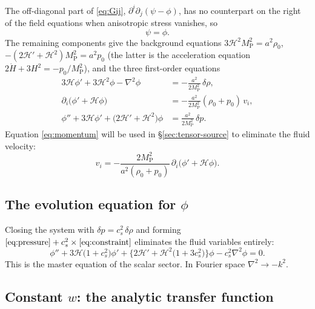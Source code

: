 \documentclass[11pt,a4paper]{article}
\newcommand{\cH}{\mathcal{H}}
\newcommand{\MP}{M_{\mathrm{P}}}
\theoremstyle{remark}
\begin{document}
The off-diagonal part of \eqref{eq:Gij}, $\partial^i\partial_j(\psi-\phi)$, has no counterpart on the right of the field equations when anisotropic stress vanishes, so
\begin{equation}
\psi = \phi .
\label{eq:psi-eq-phi}
\end{equation}
The remaining components give the background equations $3\cH^2\MP^2 = a^2\rho_0$, $-(2\cH'+\cH^2)\MP^2 = a^2p_0$ (the latter is the acceleration equation $2\dot H + 3H^2 = -p_0/\MP^2$), and the three first-order equations
\begin{align}
3\cH\phi' + 3\cH^2\phi - \nabla^2\phi &= -\frac{a^2}{2\MP^2}\,\delta\rho,
\label{eq:constraint}\\
\partial_i\big(\phi'+\cH\phi\big) &= -\frac{a^2}{2\MP^2}(\rho_0+p_0)\,v_i,
\label{eq:momentum}\\
\phi'' + 3\cH\phi' + \big(2\cH'+\cH^2\big)\phi &= \frac{a^2}{2\MP^2}\,\delta p .
\label{eq:pressure}
\end{align}
Equation \eqref{eq:momentum} will be used in \S\ref{sec:tensor-source} to eliminate the fluid velocity:
\begin{equation}
v_i = -\frac{2\MP^2}{a^2(\rho_0+p_0)}\,\partial_i\big(\phi'+\cH\phi\big).
\label{eq:velocity}
\end{equation}

\subsection{The evolution equation for \texorpdfstring{$\phi$}{phi}}

Closing the system with $\delta p = c_s^2\,\delta\rho$ and forming $\eqref{eq:pressure} + c_s^2\times\eqref{eq:constraint}$ eliminates the fluid variables entirely:
\begin{equation}
\boxed{\;
\phi'' + 3\cH\big(1+c_s^2\big)\phi' + \Big\{2\cH' + \cH^2\big(1+3c_s^2\big)\Big\}\phi - c_s^2\nabla^2\phi = 0 .\;}
\label{eq:phi-eq-eta}
\end{equation}
This is the master equation of the scalar sector. In Fourier space $\nabla^2\to-k^2$.

\subsection{Constant \texorpdfstring{$w$}{w}: the analytic transfer function}
\label{sec:Tk-analytic}
\end{document}
